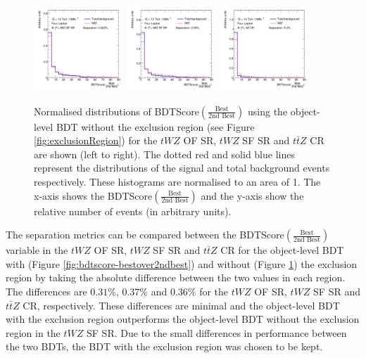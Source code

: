 \begin{figure}[h!]
    \centering
    \includegraphics[width=0.3\textwidth]{figures/bdtPlots/lep4_tWZ_4T_OF_BDT_Score_bestOver2ndBest_sep.png}
    \includegraphics[width=0.3\textwidth]{figures/bdtPlots/lep4_tWZ_4T_SF_BDT_Score_bestOver2ndBest_sep.png}
    \includegraphics[width=0.3\textwidth]{figures/bdtPlots/lep4_ttZ_4T_BDT_Score_bestOver2ndBest_sep.png}
    \caption{Normalised distributions of BDTScore$(\frac{\text{Best}}{\text{2nd Best}})$ using the object-level BDT without the exclusion region (see Figure \ref{fig:exclusionRegion}) for the $tWZ$ OF SR, $tWZ$ SF SR and $t\bar{t}Z$ CR are shown (left to right). The dotted red and solid blue lines represent the distributions of the signal and total background events respectively. These histograms are normalised to an area of 1. The x-axis shows the BDTScore$(\frac{\text{Best}}{\text{2nd Best}})$ and the y-axis show the relative number of events (in arbitrary units).}
    \label{fig:exclusionRegion-normplots}
\end{figure}

The separation metrics can be compared between the BDTScore$(\frac{\text{Best}}{\text{2nd Best}})$ variable in the $tWZ$ OF SR, $tWZ$ SF SR and $t\bar{t}Z$ CR for the object-level BDT with (Figure \ref{fig:bdtscore-bestover2ndbest}) and without (Figure \ref{fig:exclusionRegion-normplots}) the exclusion region by taking the absolute difference between the two values in each region. The differences are $0.31\%$, $0.37\%$ and $0.36\%$ for the $tWZ$ OF SR, $tWZ$ SF SR and $t\bar{t}Z$ CR, respectively. These differences are minimal and the object-level BDT with the exclusion region outperforms the object-level BDT without the exclusion region in the $tWZ$ SF SR. Due to the small differences in performance between the two BDTs, the BDT with the exclusion region was chosen to be kept.

